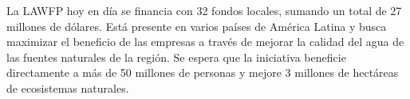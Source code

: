 La LAWFP hoy en día se financia con 32 fondos locales, sumando un total de 27 millones de dólares. Está presente en varios países de América Latina y busca maximizar el beneficio de las empresas a través de mejorar la calidad del agua de las fuentes naturales de la región. Se espera que la iniciativa beneficie directamente a más de 50 millones de personas y mejore 3 millones de hectáreas de ecosistemas naturales.

